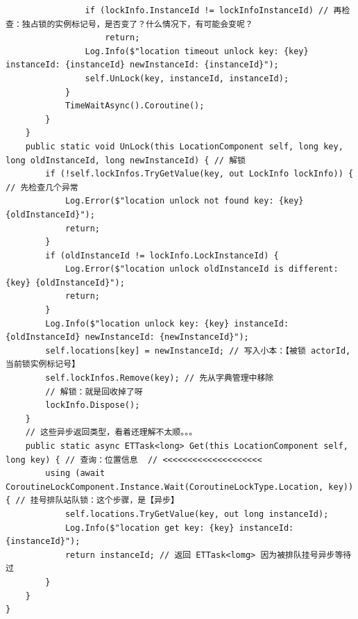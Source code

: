 \documentclass[9pt, b5paper]{article}
\begin{document}
\begin{verbatim}
                if (lockInfo.InstanceId != lockInfoInstanceId) // 再检查：独占锁的实例标记号，是否变了？什么情况下，有可能会变呢？
                    return;
                Log.Info($"location timeout unlock key: {key} instanceId: {instanceId} newInstanceId: {instanceId}");
                self.UnLock(key, instanceId, instanceId);
            }
            TimeWaitAsync().Coroutine();
        }
    }
    public static void UnLock(this LocationComponent self, long key, long oldInstanceId, long newInstanceId) { // 解锁
        if (!self.lockInfos.TryGetValue(key, out LockInfo lockInfo)) { // 先检查几个异常
            Log.Error($"location unlock not found key: {key} {oldInstanceId}");
            return;
        }
        if (oldInstanceId != lockInfo.LockInstanceId) {
            Log.Error($"location unlock oldInstanceId is different: {key} {oldInstanceId}");
            return;
        }
        Log.Info($"location unlock key: {key} instanceId: {oldInstanceId} newInstanceId: {newInstanceId}");
        self.locations[key] = newInstanceId; // 写入小本：【被锁 actorId, 当前锁实例标记号】
        self.lockInfos.Remove(key); // 先从字典管理中移除 
        // 解锁：就是回收掉了呀
        lockInfo.Dispose();
    }
    // 这些异步返回类型，看着还理解不太顺。。。
    public static async ETTask<long> Get(this LocationComponent self, long key) { // 查询：位置信息  // <<<<<<<<<<<<<<<<<<<< 
        using (await CoroutineLockComponent.Instance.Wait(CoroutineLockType.Location, key)) { // 挂号排队站队锁：这个步骤，是【异步】
            self.locations.TryGetValue(key, out long instanceId);
            Log.Info($"location get key: {key} instanceId: {instanceId}");
            return instanceId; // 返回 ETTask<lomg> 因为被排队挂号异步等待过
        }
    }
}
\end{verbatim}
\end{document}
